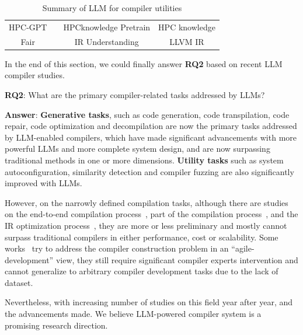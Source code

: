 \documentclass[pdflatex,sn-mathphys-ay,twocolumn, a4paper]{sn-jnl}%
\theoremstyle{thmstyleone}%
\theoremstyle{thmstyletwo}%
\theoremstyle{thmstylethree}%
\begin{document}
\begin{table}
\begin{tabular}{|c|c|c|c|}
    HPC-GPT & \citet{149_hpcgpt2023_scw} & HPCknowledge Pretrain & HPC knowledge \\
    Fair & \citet{122_fair2024_icse} & IR Understanding & LLVM IR \\
    \hline
    \end{tabular}
    \caption{Summary of LLM for compiler utilities}
    \label{tab:utility}
\end{table}

In the end of this section, we could finally answer \textbf{RQ2} based on recent LLM compiler studies.

\begin{tcolorbox}[colback=white,colframe=black]
    \textbf{RQ2}: What are the primary compiler-related tasks addressed by LLMs?

    \textbf{Answer}: \textbf{Generative tasks}, such as code generation, code transpilation, code repair, code optimization and decompilation are now the primary tasks addressed by LLM-enabled compilers, which have made significant advancements with more powerful LLMs and more complete system design, and are now surpassing traditional methods in one or more dimensions. \textbf{Utility tasks} such as system autoconfiguration, similarity detection and compiler fuzzing are also significantly improved with LLMs.

\end{tcolorbox}

However, on the narrowly defined compilation tasks, although there are studies on the end-to-end compilation process~\citep{39_armengol-estape2021learning, 70_c-x86-emnlp24,71_gao-etal-2024-virtual,5_legocompiler-arxiv25}, part of the compilation process~\citep{85_jin2025verilocc, 152_mannarswamy2022learningcombineinstructionsllvm}, and the IR optimization process~\citep{11_deng2024compilerdream_arxiv, 27_grubisic2024priority_arxiv,51_decos2025_ics,metallmcompiler-cc25}, they are more or less preliminary and mostly cannot surpass traditional compilers in either performance, cost or scalability. Some works~\citep{88_comback2024_neurips,44_vega2025_cgo} try to address the compiler construction problem in an ``agile-development'' view, they still require significant compiler experts intervention and cannot generalize to arbitrary compiler development tasks due to the lack of dataset. 

Nevertheless, with increasing number of studies on this field year after year, and the advancements made. We believe LLM-powered compiler system is a promising research direction. 
\end{document}

